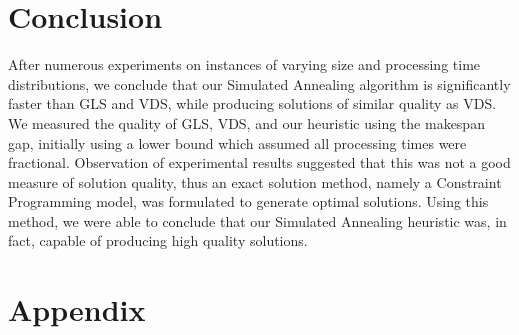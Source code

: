 \documentclass[12pt,a4paper,reqno]{article}
\begin{document}
\section{Conclusion}
After numerous experiments on instances of varying size and processing time distributions, we conclude that our Simulated Annealing algorithm is significantly faster than GLS and VDS, while producing solutions of similar quality as VDS. We measured the quality of GLS, VDS, and our heuristic using the makespan gap, initially using a lower bound which assumed all processing times were fractional. Observation of experimental results suggested that this was not a good measure of solution quality, thus an exact solution method, namely a Constraint Programming model, was formulated to generate optimal solutions. Using this method, we were able to conclude that our Simulated Annealing heuristic was, in fact, capable of producing high quality solutions.


\newpage
{}


\newpage

\section{Appendix}
\end{document}
